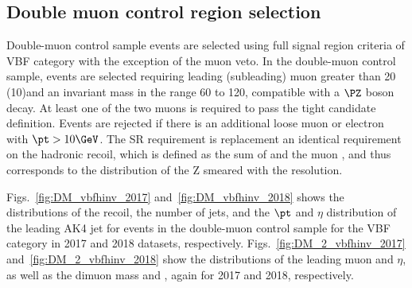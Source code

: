 {\newpage

\subsection{Double muon control region selection}
\label{sec:selection_cr_2m}
Double-muon control sample events are selected using full signal region criteria of VBF category with the exception of the muon veto. 
In the double-muon control sample, events are selected requiring leading (subleading) muon \pt greater than 20 (10)\GeV and 
an invariant mass in the range 60 to 120\GeV, compatible with a $\PZ$ boson decay. At least one of the two muons is required to 
pass the tight candidate definition. Events are rejected if there is an additional loose muon or electron with $\pt > 10\GeV$. 
The SR \ptmiss requirement is replacement an identical requirement on the hadronic recoil, which is defined as the sum of \ptvecmiss 
and the muon \vpt, and thus corresponds to the distribution of the Z \pt smeared with the \ptmiss resolution.

Figs.~\ref{fig:DM_vbfhinv_2017} and~\ref{fig:DM_vbfhinv_2018} shows the distributions of the recoil, the number of jets, 
and the $\pt$ and $\eta$ distribution of the leading AK4 jet for events in the double-muon control sample for the VBF category 
in 2017 and 2018 datasets, respectively. Figs.~\ref{fig:DM_2_vbfhinv_2017} and~\ref{fig:DM_2_vbfhinv_2018} show the distributions 
of the leading muon \pt and $\eta$, as well as the dimuon mass and \pt, again for 2017 and 2018, respectively.

}
